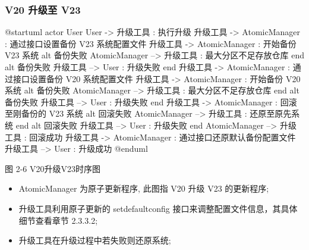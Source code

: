 \documentclass{utart}
\begin{document}
\subsubsection{V20 升级至 V23}
\begin{center}
  \begin{adjustbox}{scale=0.65}
    \begin{plantuml}
      @startuml
      actor User
      User -> 升级工具 : 执行升级
      升级工具 -> AtomicManager : 通过接口设置备份  V23 系统配置文件
      升级工具 -> AtomicManager : 开始备份 V23 系统
      alt 备份失败
      AtomicManager --> 升级工具 : 最大分区不足存放仓库
      end
      alt 备份失败
      升级工具 --> User : 升级失败
      end
      升级工具 -> AtomicManager : 通过接口设置备份  V20 系统配置文件
      升级工具 -> AtomicManager : 开始备份 V20 系统
      alt 备份失败
      AtomicManager --> 升级工具 : 最大分区不足存放仓库
      end
      alt 备份失败
      升级工具 --> User : 升级失败
      end
      升级工具 -> AtomicManager : 回滚至刚备份的 V23 系统
      alt 回滚失败
      AtomicManager --> 升级工具 : 还原至原先系统
      end
      alt 回滚失败
      升级工具 --> User : 升级失败
      end
      AtomicManager --> 升级工具 : 回滚成功
      升级工具 -> AtomicManager : 通过接口还原默认备份配置文件
      升级工具 --> User : 升级成功
      @enduml
    \end{plantuml}
    \end{adjustbox}

    图 2-6 V20升级V23时序图
\end{center}
\begin{itemize}[leftmargin=4em]
  \item AtomicManager 为原子更新程序, 此图指 V20 升级 V23 的更新程序;
  \item 升级工具利用原子更新的 setdefaultconfig 接口来调整配置文件信息，其具体细节查看章节 2.3.3.2;
  \item 升级工具在升级过程中若失败则还原系统;
\end{itemize}
\end{document}
